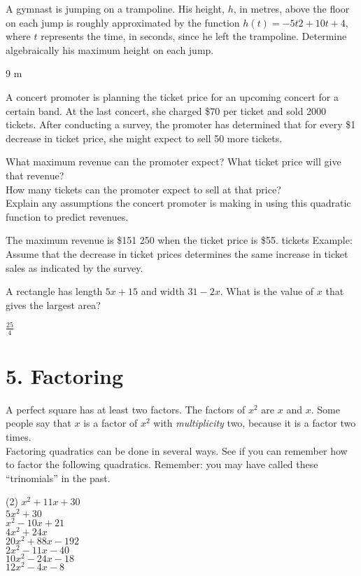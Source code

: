 \documentclass[12pt,fleqn]{book}
\newcommand{\prb}[1]{\begin{Exercise}#1\end{Exercise}}
\newcommand{\sol}[1]{\begin{Answer}#1\end{Answer}}
\begin{document}
\prb{A gymnast is jumping on a trampoline.
	His height, $h$, in metres, above the floor
	on each jump is roughly approximated
	by the function $h(t) = -5t2 + 10t + 4$,
	where $t$ represents the time, in seconds,
	since he left the trampoline. Determine
	algebraically his maximum height on
	each jump.\\[2in]}
\sol{9 m}

\prb{A concert promoter is planning the ticket
	price for an upcoming concert for a certain
	band. At the last concert, she charged
	\$70 per ticket and sold 2000 tickets. After
	conducting a survey, the promoter has
	determined that for every \$1 decrease
	in ticket price, she might expect to sell
	50 more tickets.
	\begin{tasks}
		\task What maximum revenue can the
		promoter expect? What ticket price
		will give that revenue?\\[1in]
		\task How many tickets can the promoter
		expect to sell at that price?\\[1in]
		\task Explain any assumptions the concert
		promoter is making in using this
		quadratic function to predict revenues.\\[1in]
	\end{tasks}
}
\sol{
	\begin{tasks}
		\task The maximum revenue is \$151 250 when the ticket price is \$55.
		\task 2750 tickets
		\task Example: Assume that the decrease in ticket prices determines the same increase in ticket sales as indicated by the survey.
	\end{tasks}
}

\prb{A rectangle has length $5x+15$ and width $31-2x$.  What is the value of $x$ that gives the largest area?}
\sol{$\frac{25}{4}$}










\chapter{5. Factoring}
A perfect square has at least two factors.  The factors of $x^2$ are $x$ and $x$.  Some people say that $x$ is a factor of $x^2$ with \emph{multiplicity} two, because it is a factor two times.
\\[1em]
Factoring quadratics can be done in several ways.  See if you can remember how to factor the following quadratics.  Remember: you may have called these ``trinomials'' in the past.
\begin{tasks}(2)
	\task $x^2+11x + 30$\\[2em]
	\task $5x^2 + 30 $\\[2em]
	\task $x^2-10x +21 $\\[2em]
	\task $4x^2 + 24x $\\[2em]
	\task $20x^2+88x-192 $\\[2em]
	\task $2x^2 -11x -40 $\\[2em]
	\task $10x^2 -24x -18 $\\[2em]
	\task $12x^2-4x-8$\\[2em]
\end{tasks}
\end{document}
